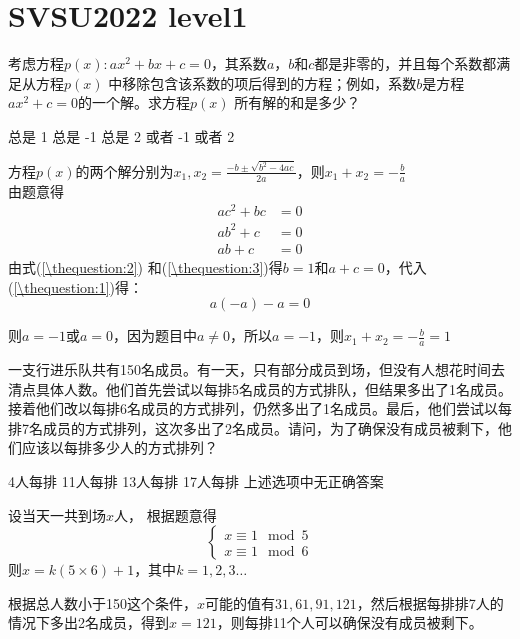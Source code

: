 \section{SVSU2022 level1}
\begin{questions}
	\question 考虑方程$p(x): ax^2 + bx + c=0$，其系数$a$，$b$和$c$都是非零的，并且每个系数都满足从方程$p(x)$
	中移除包含该系数的项后得到的方程；例如，系数$b$是方程 $ax^2+c=0$的一个解。求方程$p(x)$
	所有解的和是多少？

	\begin{oneparchoices}
		\CorrectChoice 总是 1 \choice 总是 -1 \choice 总是 2  或者 -1  或者 2
	\end{oneparchoices}
	\begin{solution}
		方程$p(x)$的两个解分别为$\displaystyle x_1, x_2 = \frac{-b \pm \sqrt{b^2 - 4ac}}{2a}$，则$\displaystyle x_1 +
			x_2 = -\frac{b}{a}$\\
		由题意得
		\begin{align}
			ac^2  + bc & = 0 \label{\thequestion:1} \\
			ab^2  + c  & = 0 \label{\thequestion:2} \\
			ab    + c  & = 0 \label{\thequestion:3}
		\end{align}
		由式(\ref{\thequestion:2}) 和(\ref{\thequestion:3})得$b=1$和$a+c=0$，代入(\ref{\thequestion:1})得：
		\begin{equation}
			a(-a) -a  = 0
		\end{equation}

		则$a=-1$或$a=0$，因为题目中$a \ne 0$，所以$a=-1$，则$\displaystyle x_1 + x_2 = -\frac{b}{a}=1$
	\end{solution}
	\question 一支行进乐队共有150名成员。有一天，只有部分成员到场，但没有人想花时间去清点具体人数。他们首先尝试以每排5名成员的方式排队，但结果多出了1名成员。接着他们改以每排6名成员的方式排列，仍然多出了1名成员。最后，他们尝试以每排7名成员的方式排列，这次多出了2名成员。请问，为了确保没有成员被剩下，他们应该以每排多少人的方式排列？

	\begin{oneparchoices}
		\choice 4人每排
		\CorrectChoice 11人每排
		\choice 13人每排
		\choice 17人每排
		\choice 上述选项中无正确答案
	\end{oneparchoices}
	\begin{solution}
		设当天一共到场$x$人， 根据题意得
		\begin{equation}
			\begin{cases}
				x \equiv 1 \mod 5 \\
				x \equiv 1 \mod 6
			\end{cases}
		\end{equation}
		则$x=k(5 \times 6) + 1$，其中$k=1,2,3 \ldots$

		根据总人数小于150这个条件，$x$可能的值有$31,61,91,121$，然后根据每排排7人的情况下多出2名成员，得到$x=121$，则每排11个人可以确保没有成员被剩下。

	\end{solution}
\end{questions}
